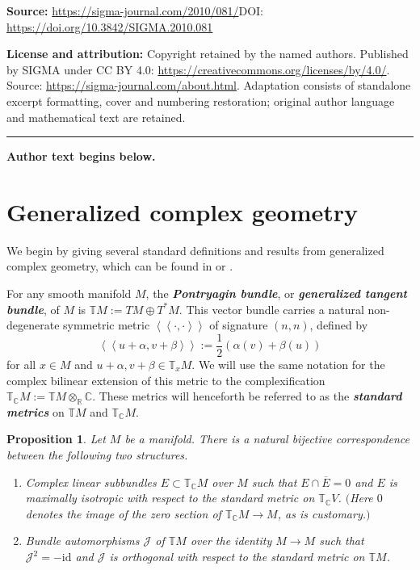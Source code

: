 \documentclass[11pt]{article}
\newtheorem{Proposition}[Theorem]{Proposition}
\numberwithin{equation}{section}
\newcommand{\deff}[1]{\textbf{\emph{#1}}}
\newcommand{\pont}[1]{\mathbb{T} {#1}}
\newcommand{\cpont}[1]{\mathbb{T}_{\mathbb{C}} {#1}}
\newcommand{\tang}{T}
\newcommand{\iiprod}[2]{\left\langle \! \left\langle {#1} , {#2} \right\rangle \! \right\rangle}
\begin{document}
\noindent\textbf{Source:} \url{https://sigma-journal.com/2010/081/}\quad DOI: \url{https://doi.org/10.3842/SIGMA.2010.081}\par
\noindent\textbf{License and attribution:} Copyright retained by the named authors. Published by SIGMA under CC BY 4.0: \url{https://creativecommons.org/licenses/by/4.0/}. Source: \url{https://sigma-journal.com/about.html}. Adaptation consists of standalone excerpt formatting, cover and numbering restoration; original author language and mathematical text are retained.\par
\medskip\hrule\medskip\noindent\textbf{Author text begins below.}\par
\setcounter{section}{1}
\setcounter{subsection}{0}
\setcounter{subsubsection}{0}
\setcounter{Theorem}{0}
\setcounter{equation}{0}
\section{Generalized complex geometry}\label{section1}

We begin by giving several standard def\/initions and results from generalized complex geometry, which can be found in \cite{gualtieri} or \cite{benbassat}.

For any smooth manifold $M$, the \deff{Pontryagin bundle}, or \deff{generalized tangent bundle}, of $M$ is $\pont{M} := \tang M \oplus \tang^* M$.  This vector bundle carries a natural non-degenerate symmetric metric $\iiprod{\cdot}{\cdot}$ of signature $(n,n)$, def\/ined by
\[
  \iiprod{u+\alpha}{v+\beta}
  :=
  \frac{1}{2} \left( \alpha(v) + \beta(u) \right)
\]
for all $x \in M$ and $u+\alpha, v+\beta \in \mathbb{T}_x M$.  We will use the same notation for the complex bilinear extension of this metric to the complexif\/ication $\cpont{M} := \pont{M} \otimes_{\mathbb{R}} \mathbb{C}$.
These metrics will henceforth be referred to as the \deff{standard metrics} on $\pont{M}$ and $\cpont{M}$.


\begin{Proposition} \label{prop4}
Let $M$ be a manifold.
There is a natural bijective correspondence between the following two structures.
  \begin{enumerate}\itemsep=0pt
    \item Complex linear subbundles $E \subset \cpont{M}$ over $M$ such that $E \cap \overline{E} = 0$ and $E$ is maximally isotropic with respect to the standard metric on $\cpont{V}$.  $($Here $0$ denotes the image of the zero section of $\cpont{M} \to M$, as is customary.$)$
    \item Bundle automorphisms $\mathcal{J}$ of $\pont{M}$ over the identity $M \to M$ such that $\mathcal{J}^2 = - \mathrm{id}$ and $\mathcal{J}$ is orthogonal with respect to the standard metric on $\pont{M}$.
  \end{enumerate}
\end{Proposition}
\end{document}
